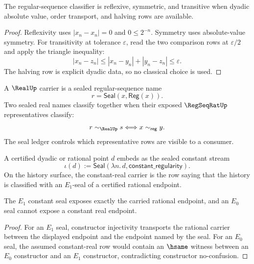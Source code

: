 \begin{theorem}
\label{thm:countable-completion-regseq-classifier-laws}
The regular-sequence classifier is reflexive, symmetric, and transitive when
dyadic absolute value, order transport, and halving rows are available.
\end{theorem}

\begin{proof}
Reflexivity uses $|x_n-x_n|=0$ and $0\le 2^{-n}$.  Symmetry uses
absolute-value symmetry.  For transitivity at tolerance $\varepsilon$, read
the two comparison rows at $\varepsilon/2$ and apply the triangle inequality:
$$
|x_n-z_n|
\le
|x_n-y_n|+|y_n-z_n|
\le
\varepsilon.
$$
The halving row is explicit dyadic data, so no classical choice is used.
\end{proof}

\begin{definition}
\label{def:countable-completion-real-carrier}
A $\RealUp$ carrier is a sealed regular-sequence name
$$
r=\mathsf{Seal}(x,\mathsf{Reg}(x)).
$$
Two sealed real names classify together when their exposed
$\RegSeqRatUp$ representatives classify:
$$
r\sim_{\RealUp}s
\Longleftrightarrow
x\sim_{\mathsf{reg}}y.
$$
The seal ledger controls which representative rows are visible to a consumer.
\end{definition}

\begin{definition}
\label{def:countable-completion-constant-real}
A certified dyadic or rational point $d$ embeds as the sealed constant stream
$$
\iota(d):=\mathsf{Seal}(\lambda n.\,d,\mathsf{constant\_regularity}).
$$
On the history surface, the constant-real carrier is the row saying that the
history is classified with an $E_1$-seal of a certified rational endpoint.
\end{definition}

\begin{theorem}
\label{thm:countable-completion-constant-real-boundary}
The $E_1$ constant seal exposes exactly the carried rational endpoint, and
an $E_0$ seal cannot expose a constant real endpoint.
\end{theorem}

\begin{proof}
For an $E_1$ seal, constructor injectivity transports the rational carrier
between the displayed endpoint and the endpoint named by the seal.  For an
$E_0$ seal, the assumed constant-real row would contain an $\hsame$ witness
between an $E_0$ constructor and an $E_1$ constructor, contradicting
constructor no-confusion.
\end{proof}

